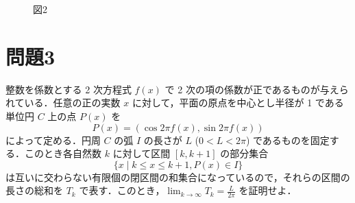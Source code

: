 \documentclass[unicode,12pt, A4j]{ltjsarticle}%
\begin{document}
    \begin{figure}[h]
     \centering
     \caption{図2}

    \end{figure}


\section{問題3}
整数を係数とする 2 次方程式 $f(x)$ で 2 次の項の係数が正であるものが与えられている．任意の正の実数 $x$ に対して，平面の原点を中心とし半径が 1 である単位円 $C$ 上の点 $P(x)$ を
\[
P(x) = (\cos 2\pi f(x), \sin 2\pi f(x))
\]
によって定める．円周 $C$ の弧 $I$ の長さが $L$ ($0 < L < 2\pi$) であるものを固定する．このとき各自然数 $k$ に対して区間 $[k, k+1]$ の部分集合
\[
\{x \mid k \le x \le k+1, P(x) \in I \}
\]
は互いに交わらない有限個の閉区間の和集合になっているので，それらの区間の長さの総和を $T_k$ で表す．このとき，$\lim_{k \to \infty} T_k = \frac{L}{2\pi}$ を証明せよ．
\end{document}
